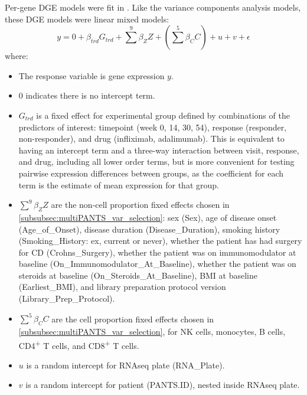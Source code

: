 Per-gene \gls{DGE} models were fit in  \autocite{hoffman2020DreamPowerfulDifferential}.
Like the variance components analysis models, these \gls{DGE} models were linear mixed models:
%
%
\begin{equation}
y = 0 + \beta_{trd} G_{trd} + \sum_{}^{9}{\beta_Z Z} + (\sum_{}^{5}{\beta_C C}) + u + v + \epsilon
\label{eq:multiPANTS_dge_model}
\end{equation}
where:
\begin{itemize}
    \item The response variable is gene expression $y$.
    \item 0 indicates there is no intercept term.
    \item $G_{trd}$ is a fixed effect for experimental group defined by combinations of the predictors of interest:
        timepoint (week 0, 14, 30, 54), 
        response (responder, non-responder), 
        and drug (infliximab, adalimumab).
        This is equivalent to having an intercept term and a three-way interaction between visit, response, and drug, including all lower order terms,
        but is more convenient for testing pairwise expression differences between groups,
        as the coefficient for each term is the estimate of mean expression for that group.
    \item $\sum_{}^{9}{\beta_Z Z}$ are the non-cell proportion fixed effects chosen in \cref{subsubsec:multiPANTS_var_selection}:
        sex (Sex), 
        age of disease onset (Age\_of\_Onset), disease duration (Disease\_Duration), 
        smoking history (Smoking\_History: ex, current or never), 
        whether the patient has had surgery for \gls{CD} (Crohns\_Surgery), 
        whether the patient was on immunomodulator at baseline (On\_Immunomodulator\_At\_Baseline), 
        whether the patient was on steroids at baseline (On\_Steroids\_At\_Baseline), 
        \gls{BMI} at baseline (Earliest\_BMI),
        and library preparation protocol version (Library\_Prep\_Protocol).
    \item $\sum_{}^{5}{\beta_C C}$ are the cell proportion fixed effects chosen in \cref{subsubsec:multiPANTS_var_selection},
        for \gls{NK} cells, monocytes, B cells, CD4\textsuperscript{+} T cells, and CD8\textsuperscript{+} T cells.
    \item $u$ is a random intercept for \gls{RNAseq} plate (RNA\_Plate).
    \item $v$ is a random intercept for patient (PANTS.ID), nested inside \gls{RNAseq} plate.
\end{itemize}

